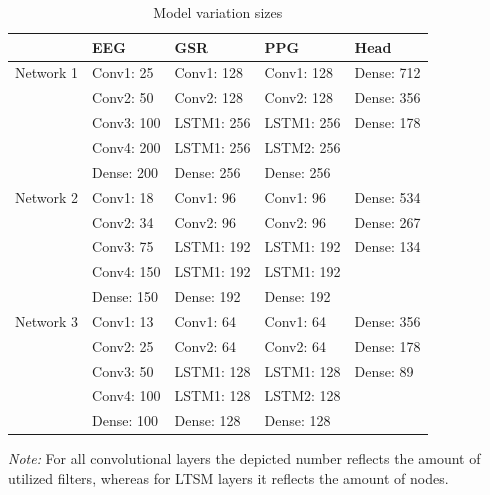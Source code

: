 \documentclass[12pt]{article}
\begin{document}
\bgroup
\def\arraystretch{1.6}%
\begin{table}[h]
\caption{Model variation sizes}
\label{table:modelvariations}
\begin{tabular}{lllll}
\hline
        & EEG        & GSR        & PPG        & Head       \\ \hline
Network 1 & Conv1: 25  & Conv1: 128 & Conv1: 128 & Dense: 712 \\
        & Conv2: 50  & Conv2: 128 & Conv2: 128 & Dense: 356 \\
        & Conv3: 100 & LSTM1: 256 & LSTM1: 256 & Dense: 178 \\
        & Conv4: 200 & LSTM1: 256 & LSTM2: 256 &            \\ 
        \vspace{3ex}
        & Dense: 200 & Dense: 256 & Dense: 256 &            \\ \hline
Network 2 & Conv1: 18  & Conv1: 96  & Conv1: 96  & Dense: 534 \\
        & Conv2: 34  & Conv2: 96  & Conv2: 96  & Dense: 267 \\
        & Conv3: 75  & LSTM1: 192 & LSTM1: 192 & Dense: 134 \\
        & Conv4: 150 & LSTM1: 192 & LSTM1: 192 &            \\
        \vspace{3ex}
        & Dense: 150 & Dense: 192 & Dense: 192 &            \\ \hline
Network 3 & Conv1: 13  & Conv1: 64  & Conv1: 64  & Dense: 356 \\
        & Conv2: 25  & Conv2: 64  & Conv2: 64  & Dense: 178 \\
        & Conv3: 50  & LSTM1: 128 & LSTM1: 128 & Dense: 89  \\
        & Conv4: 100 & LSTM1: 128 & LSTM2: 128 &            \\
        & Dense: 100 & Dense: 128 & Dense: 128 &            \\ \hline
\end{tabular}
\vspace{2ex}

\begin{doublespacing}
{\raggedright \textit{Note:} For all convolutional layers the depicted number reflects the amount of utilized filters, whereas for LTSM layers it reflects the amount  of nodes. \par}
\end{doublespacing}
\end{table}
\egroup
\end{document}
